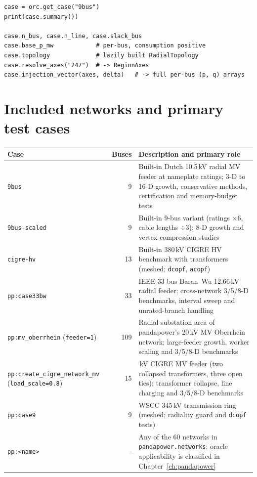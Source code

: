 \documentclass[11pt,a4paper]{report}
\newcommand{\code}[1]{\texttt{\small #1}}
\begin{document}
\begin{lstlisting}
case = orc.get_case("9bus")
print(case.summary())

case.n_bus, case.n_line, case.slack_bus
case.base_p_mw            # per-bus, consumption positive
case.topology             # lazily built RadialTopology
case.resolve_axes("247")  # -> RegionAxes
case.injection_vector(axes, delta)   # -> full per-bus (p, q) arrays
\end{lstlisting}

\section{Included networks and primary test cases}

\begin{center}\small
\begin{tabular}{@{}>{\raggedright\arraybackslash}p{4.7cm}r>{\raggedright\arraybackslash}p{8.9cm}@{}}
\toprule
Case & Buses & Description and primary role \\
\midrule
\code{9bus} & 9 & Built-in Dutch 10.5\,kV radial MV feeder at nameplate ratings; 3-D to 16-D growth, conservative methods, certification and memory-budget tests \\
\code{9bus-scaled} & 9 & Built-in 9-bus variant (ratings $\times 6$, cable lengths $\div 3$); 8-D growth and vertex-compression studies \\
\code{cigre-hv} & 13 & Built-in 380\,kV CIGRE HV benchmark with transformers (meshed; \code{dcopf}, \code{acopf}) \\
\code{pp:case33bw} & 33 & IEEE 33-bus Baran--Wu 12.66\,kV radial feeder; cross-network 3/5/8-D benchmarks, interval sweep and unrated-branch handling \\
\code{pp:mv\_oberrhein} (\code{feeder=1}) & 109 & Radial substation area of pandapower's 20\,kV MV Oberrhein network; large-feeder growth, worker scaling and 3/5/8-D benchmarks \\
\code{pp:create\_cigre\_network\_mv} (\code{load\_scale=0.8}) & 15 & 20\,kV CIGRE MV feeder (two collapsed transformers, three open ties); transformer collapse, line charging and 3/5/8-D benchmarks \\
\code{pp:case9} & 9 & WSCC 345\,kV transmission ring (meshed; radiality guard and \code{dcopf} tests) \\
\code{pp:<name>} & -- & Any of the 60 networks in \code{pandapower.networks}; oracle applicability is classified in Chapter~\ref{ch:pandapower} \\
\bottomrule
\end{tabular}
\end{center}
\end{document}

